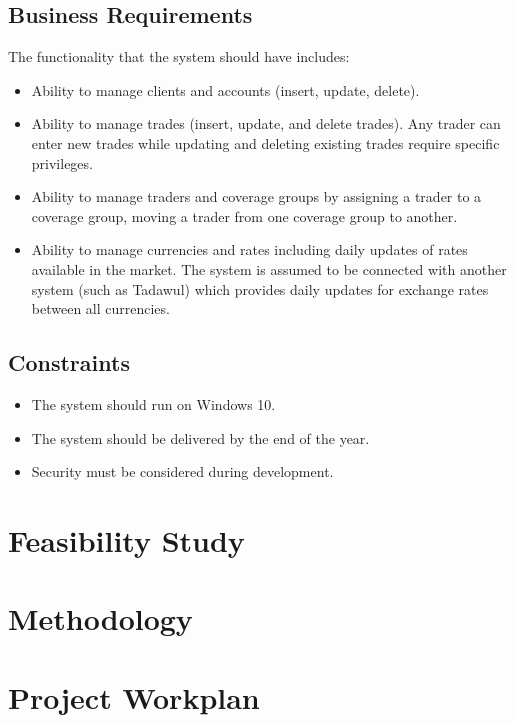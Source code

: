 \documentclass[a4paper]{report}
\begin{document}
\subsection{Business Requirements}
The functionality that the system should have includes:
\begin{itemize}
    \item Ability to manage clients and accounts (insert, update, delete).
    \item Ability to manage trades (insert, update, and delete trades). Any trader can enter new trades while updating and deleting existing trades require specific privileges.
    \item Ability to manage traders and coverage groups by assigning a trader to a coverage group, moving a trader from one coverage group to another.
    \item Ability to manage currencies and rates including daily updates of rates available in the market. The system is assumed to be connected with another system (such as Tadawul) which provides daily updates for exchange rates between all currencies.
\end{itemize}

\subsection{Constraints}
\begin{itemize}
    \item The system should run on Windows 10.
    \item The system should be delivered by the end of the year.
    \item Security must be considered during development.
\end{itemize}

\section{Feasibility Study}

\section{Methodology}

\section{Project Workplan}
\end{document}
